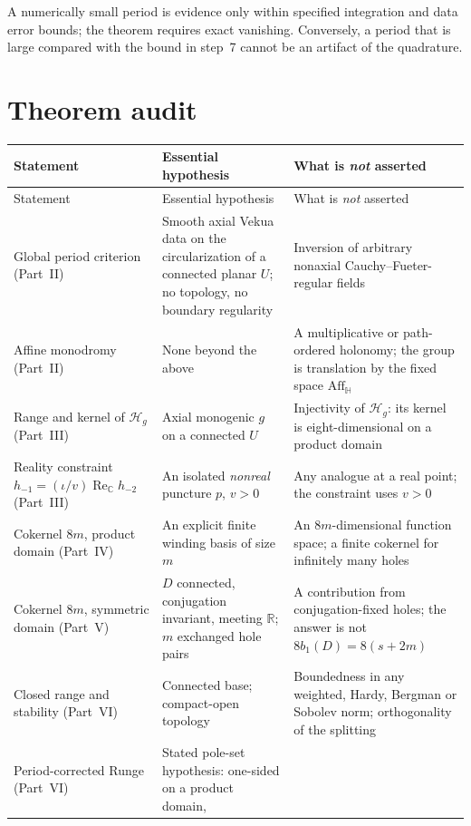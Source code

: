 \documentclass[11pt,a4paper]{article}
\numberwithin{equation}{section}
\theoremstyle{definition}
\theoremstyle{remark}
\theoremstyle{plain}
\newcommand{\HH}{\mathbb H}
\newcommand{\RR}{\mathbb R}
\newcommand{\CC}{\mathbb C}
\DeclareMathOperator{\Rea}{Re}
\newcommand{\ReC}{\Rea_{\CC}}
\newcommand{\Aff}{\mathrm{Aff}_{\HH}}
\newcommand{\Hg}{\mathcal H_{g}}      %
\begin{document}
A numerically small period is evidence only within specified integration and
data error bounds; the theorem requires exact vanishing. Conversely, a
period that is large compared with the bound in step~7 cannot be an artifact
of the quadrature.

\section{Theorem audit}
\label{f:app:theorem-audit}

{\small
\renewcommand{\arraystretch}{1.25}
\setlength{\LTpre}{8pt}\setlength{\LTpost}{8pt}
\begin{longtable}{@{}p{}p{}p{}@{}}
\toprule
Statement & Essential hypothesis & What is \emph{not} asserted\\
\midrule
\endfirsthead
\toprule
Statement & Essential hypothesis & What is \emph{not} asserted\\
\midrule
\endhead
Global period criterion (Part~II) &
Smooth axial Vekua data on the circularization of a connected planar $U$;
no topology, no boundary regularity &
Inversion of arbitrary nonaxial Cauchy--Fueter-regular fields\\
Affine monodromy (Part~II) &
None beyond the above &
A multiplicative or path-ordered holonomy; the group is translation by the
fixed space $\Aff$\\
Range and kernel of $\Hg$ (Part~III) &
Axial monogenic $g$ on a connected $U$ &
Injectivity of $\Hg$: its kernel is eight-dimensional on a product domain\\
Reality constraint $h_{-1}=(\iota/v)\ReC h_{-2}$ (Part~III) &
An isolated \emph{nonreal} puncture $p$, $v>0$ &
Any analogue at a real point; the constraint uses $v>0$\\
Cokernel $8m$, product domain (Part~IV) &
An explicit finite winding basis of size $m$ &
An $8m$-dimensional function space; a finite cokernel for infinitely many
holes\\
Cokernel $8m$, symmetric domain (Part~V) &
$D$ connected, conjugation invariant, meeting $\RR$; $m$ exchanged hole
pairs &
A contribution from conjugation-fixed holes; the answer is not
$8b_1(D)=8(s+2m)$\\
Closed range and stability (Part~VI) &
Connected base; compact-open topology &
Boundedness in any weighted, Hardy, Bergman or Sobolev norm; orthogonality
of the splitting\\
Period-corrected Runge (Part~VI) &
Stated pole-set hypothesis: one-sided on a product domain,

\end{longtable}}
\end{document}
